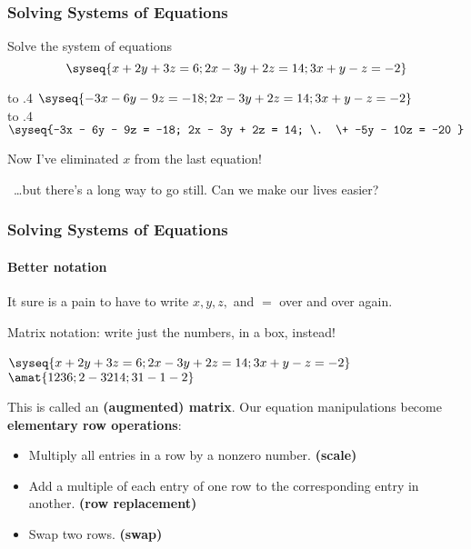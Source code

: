 
\begin{frame}
\frametitle{Solving Systems of Equations}

\vskip-3mm
\begin{eg}
  Solve the system of equations
  \[\syseq{x + 2y + 3z = 6;
    2x - 3y + 2z = 14;
    3x + y - z = -2
  }\]
\end{eg}\pause

\begin{webonly}
\leavevmode
\hbox to .4
\hskip 5mm
  $\syseq{-3x - 6y - 9z = -18;
    2x - 3y + 2z = 14;
    3x + y - z = -2
  }$\\[4mm]
\leavevmode
\hbox to .4
\hskip 5mm
  $\syseq{-3x - 6y - 9z = -18;
    2x - 3y + 2z = 14;
    \. \+ -5y - 10z = -20
  }$
\end{webonly}

\bigskip

Now I've eliminated $x$ from the last equation!

\pause\medskip
~\ldots but there's a long way to go still.  Can we make our lives easier?

\end{frame}



\begin{frame}
\frametitle{Solving Systems of Equations}
\framesubtitle{Better notation}

It sure is a pain to have to write $x, y, z,$ and $=$ over and over again.
\pause

\bigskip
\alert{Matrix notation:} write just the numbers, in a box, instead!

\begin{center}
\bigskip
  $\syseq{x + 2y + 3z = 6;
    2x - 3y + 2z = 14;
    3x + y - z = -2
  }$
~\longsquiggly[becomes]~
$\amat{
1  2  3  6 ;
2  -3  2  14; 
3  1  -1  -2
}$
\end{center}

\pause\medskip
This is called an \textbf{(augmented) matrix}.  Our equation manipulations
become \textbf{elementary row operations}:


\pause\medskip
\begin{itemize}
  \item Multiply all entries in a row by a nonzero number.
    {\hfill\bf\color{seq-blue}(scale)}
    \pause
  \item Add a multiple of each entry of one row to the
    corresponding entry in another.
      \hfill{\bf\color{seq-blue}(row replacement)}
    \pause
  \item Swap two rows.
      {\hfill\bf\color{seq-blue}(swap)}
\end{itemize}

\end{frame}


